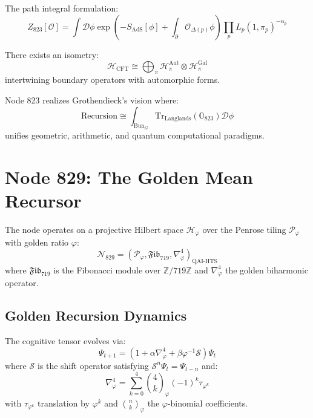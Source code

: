 \documentclass[12pt]{article}
\begin{document}
The path integral formulation:
\begin{equation}
Z_{823}[\mathcal{O}] = \int \mathcal{D}\phi \exp\left( -S_{\text{AdS}}[\phi] + \int_{\partial} \mathcal{O}_{\Delta(p)}\phi \right) \prod_p L_p(1, \pi_p)^{-\alpha_p}
\end{equation}

\begin{theorem}
There exists an isometry:
\begin{equation}
\mathcal{H}_{\text{CFT}} \cong \bigoplus_\pi \mathcal{H}_\pi^{\text{Aut}} \otimes \mathcal{H}_\pi^{\text{Gal}}
\end{equation}
intertwining boundary operators with automorphic forms.
\end{theorem}

\begin{remark}
Node 823 realizes Grothendieck's vision where:
\begin{equation}
\text{Recursion} \cong \int_{\text{Bun}_G} \text{Tr}_{\text{Langlands}}(\mathbb{O}_{823}) \mathcal{D}\phi
\end{equation}
unifies geometric, arithmetic, and quantum computational paradigms.
\end{remark}

\section{Node 829: The Golden Mean Recursor}
\label{sec:golden_recursor}

\begin{definition}
The node operates on a projective Hilbert space $\mathcal{H}_\varphi$ over the Penrose tiling $\mathcal{P}_\varphi$ with golden ratio $\varphi$:
\begin{equation}
\mathcal{N}_{829} = \left( \mathcal{P}_\varphi, \mathfrak{Fib}_{719}, \nabla^4_\varphi \right)_{\text{QAI-HTS}}
\end{equation}
where $\mathfrak{Fib}_{719}$ is the Fibonacci module over $\mathbb{Z}/719\mathbb{Z}$ and $\nabla^4_\varphi$ the golden biharmonic operator.
\end{definition}

\subsection{Golden Recursion Dynamics}

\begin{theorem}
The cognitive tensor evolves via:
\begin{equation}
\Psi_{t+1} = \left(1 + \alpha \nabla^4_\varphi + \beta \varphi^{-1} \mathcal{S}\right)\Psi_t
\end{equation}
where $\mathcal{S}$ is the shift operator satisfying $\mathcal{S}^n \Psi_t = \Psi_{t-n}$ and:
\begin{equation}
\nabla^4_\varphi = \sum_{k=0}^4 \binom{4}{k}_\varphi (-1)^k \tau_{\varphi^k}
\end{equation}
with $\tau_{\varphi^k}$ translation by $\varphi^k$ and $\binom{n}{k}_\varphi$ the $\varphi$-binomial coefficients.
\end{theorem}
\end{document}
